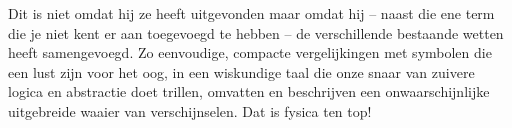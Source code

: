 \documentclass{ximera}
\begin{document}
	
	
	Dit is niet omdat hij ze heeft uitgevonden maar omdat hij -- naast die ene term die je niet kent er aan toegevoegd te hebben -- de verschillende bestaande wetten heeft samengevoegd. Zo eenvoudige, compacte vergelijkingen met symbolen die een lust zijn voor het oog, in een wiskundige taal die onze snaar van zuivere logica en abstractie doet trillen, omvatten en beschrijven een onwaarschijnlijke uitgebreide waaier van verschijnselen. Dat is fysica ten top!
	
\end{document}
